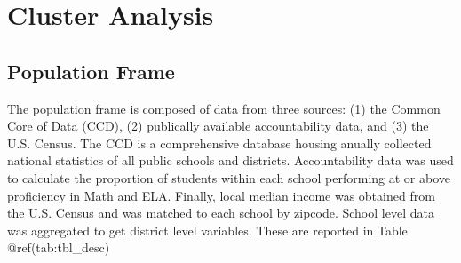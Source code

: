 \documentclass[floatsintext,man]{apa6}
\theoremstyle{definition}
\theoremstyle{definition}
\theoremstyle{definition}
\theoremstyle{remark}
\begin{document}
\section{Cluster Analysis}\label{cluster-analysis}

\subsection{Population Frame}\label{population-frame}

The population frame is composed of data from three sources: (1) the
Common Core of Data (CCD), (2) publically available accountability data,
and (3) the U.S. Census. The CCD is a comprehensive database housing
anually collected national statistics of all public schools and
districts. Accountability data was used to calculate the proportion of
students within each school performing at or above proficiency in Math
and ELA. Finally, local median income was obtained from the U.S. Census
and was matched to each school by zipcode. School level data was
aggregated to get district level variables. These are reported in Table
@ref(tab:tbl\_desc)
\end{document}

